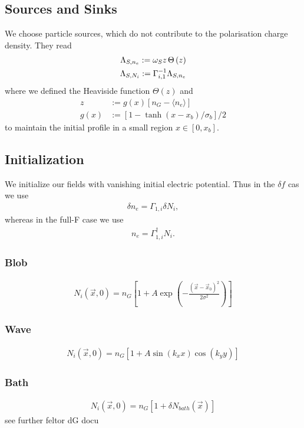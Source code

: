 \subsection{Sources and Sinks}
We choose particle sources, which do not contribute to the polarisation charge density. They read
\begin{align}
 \Lambda_{S,n_e} :=\omega_S z \hspace{0.5mm} \Theta \left(z\right)  \\
 \Lambda_{S,N_i} := \Gamma_{i,1}^{-1} \Lambda_{S,n_e}
\end{align}
where we defined the  Heaviside function \(\Theta(z)\) and  
 \begin{align}
  z&:=g(x) \left[n_G - \langle n_e \rangle\right] \\
  g(x) &:= \left[1-\tanh{(x-x_b)/\sigma_b}\right]/2 
 \end{align}
to maintain the initial profile in a small region \(x \in \left[0,x_b\right]\).
\subsection{Initialization}
We initialize our fields with vanishing initial electric potential. Thus in the \(\delta f\) cas we use
\begin{align}
  \delta n_e  =\Gamma_{1,i} \delta  N_i,
\end{align}
whereas in the full-F case we use
\begin{align}
  n_e  =\Gamma_{1,i}^\dagger N_i.
\end{align}
\subsubsection{Blob}
\begin{align}
N_{i}\left(\vec{x},0\right) =   n_G\left[1+A \exp{\left(-\frac{\left(\vec{x}-\vec{x}_0\right)^2}{2\sigma^2}\right)}\right]
\end{align}
\subsubsection{Wave}
\begin{align}
N_{i}\left(\vec{x},0\right) =   n_G\left[1+A \sin{(k_x x)} \cos{(k_y y)}\right]  
\end{align}
\subsubsection{Bath}
\begin{align}
N_{i}\left(\vec{x},0\right) =   n_G\left[1+\delta N_{bath}(\vec{x})\right]  
\end{align}
see further feltor dG docu
